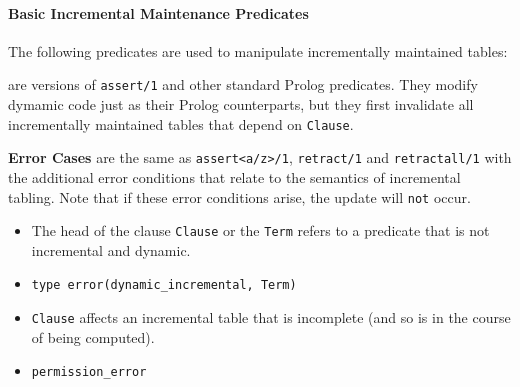 \paragraph{Basic Incremental Maintenance Predicates}
The following predicates are used to manipulate incrementally
maintained tables:

\begin{description}
% 
are versions of {\tt assert/1} and other standard Prolog predicates.
They modify dymamic code just as their Prolog counterparts, but they
first invalidate all incrementally maintained tables that depend on
{\tt Clause}.

{\bf Error Cases} are the same as {\tt assert<a/z>/1}, {\tt retract/1}
and {\tt retractall/1} with the additional error conditions that
relate to the semantics of incremental tabling.  Note that if these
error conditions arise, the update will {\tt not} occur.

\begin{itemize}
\item The head of the clause {\tt Clause} or the {\tt Term} refers to
  a predicate that is not incremental and dynamic.  
\bi
\item  {\tt type error(dynamic\_incremental, Term)}
\ei
%
\item {\tt Clause} affects an incremental table that is incomplete
  (and so is in the course of being computed).
\bi
\item  {\tt permission\_error}
\ei 
\end{itemize}



\end{description}
